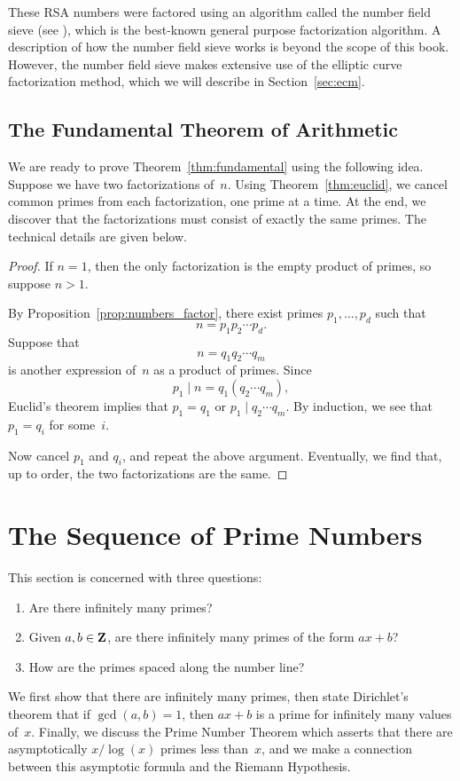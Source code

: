 These RSA numbers were factored using an algorithm called the number
field sieve (see \cite{lenstras:nfs}), which is the best-known general
purpose factorization algorithm.  A description of how the number
field sieve works is beyond the scope of this book.  However, the
number field sieve makes extensive use of the elliptic curve
factorization method, which we will describe in Section~\ref{sec:ecm}.

\subsection{The Fundamental Theorem of Arithmetic}%
\label{sec:proof_fundamental}
We are ready to prove Theorem~\ref{thm:fundamental}
using the following idea.
Suppose we have two factorizations of~$n$. Using
Theorem~\ref{thm:euclid}, we cancel common primes from each factorization,
one prime at a time.  At the end,
we discover that the factorizations must
consist of exactly the same primes.  The
technical details are given below.
\begin{proof}
  If $n=1$, then the only factorization is the empty
  product of primes, so suppose $n>1$.

  By Proposition~\ref{prop:numbers_factor}, there exist primes
  $p_1,\ldots, p_d$ such that
$$
  n = p_1 p_2 \cdots p_d.
$$
Suppose that
$$n = q_1 q_2 \cdots q_m$$
is another expression of~$n$ as a product of primes.
Since
$$p_1 \mid n = q_1 (q_2 \cdots q_m),$$
Euclid's theorem implies that $p_1 = q_1$ or
$p_1 \mid q_2\cdots q_m$.  By induction, we see that $p_1 = q_i$ for some~$i$.

Now cancel $p_1$ and $q_i$, and repeat the above argument.  Eventually,
we find that, up to order, the two factorizations are the same.
\end{proof}



\section{The Sequence of Prime Numbers}
\label{sec:primeseq}
This section is concerned with three questions:
\begin{enumerate}
\item Are there infinitely many primes?
\item Given $a,b\in\mathbf{Z}$,
are there infinitely many primes of the form $ax+b$?
\item How are the primes spaced along the number line?
\end{enumerate}
We first show that there are infinitely
many primes, then state Dirichlet's theorem
 that if $\gcd(a,b)=1$,
then $ax+b$ is a prime for infinitely many values of~$x$. Finally, we
discuss the Prime Number Theorem
which asserts that there are
asymptotically $x/\log(x)$ primes less than~$x$,
and we make a connection between this asymptotic formula
and the Riemann Hypothesis.

